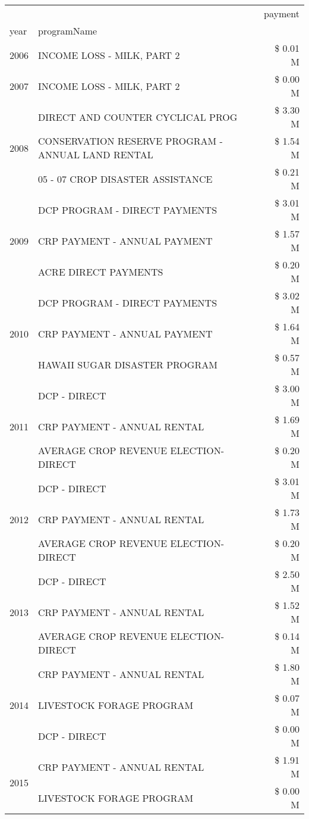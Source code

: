 \begin{tabular}{llr}
\toprule
 &  & payment \\
year & programName &  \\
\midrule
2006 & INCOME LOSS - MILK, PART 2 & \$ 0.01 M \\
\cline{1-3}
2007 & INCOME LOSS - MILK, PART 2 & \$ 0.00 M \\
\cline{1-3}
\multirow[t]{3}{*}{2008} & DIRECT AND COUNTER CYCLICAL PROG & \$ 3.30 M \\
 & CONSERVATION RESERVE PROGRAM - ANNUAL LAND RENTAL & \$ 1.54 M \\
 & 05 - 07 CROP DISASTER ASSISTANCE & \$ 0.21 M \\
\cline{1-3}
\multirow[t]{3}{*}{2009} & DCP PROGRAM - DIRECT PAYMENTS & \$ 3.01 M \\
 & CRP PAYMENT - ANNUAL PAYMENT & \$ 1.57 M \\
 & ACRE DIRECT PAYMENTS & \$ 0.20 M \\
\cline{1-3}
\multirow[t]{3}{*}{2010} & DCP PROGRAM - DIRECT PAYMENTS & \$ 3.02 M \\
 & CRP PAYMENT - ANNUAL PAYMENT & \$ 1.64 M \\
 & HAWAII SUGAR DISASTER PROGRAM & \$ 0.57 M \\
\cline{1-3}
\multirow[t]{3}{*}{2011} & DCP - DIRECT & \$ 3.00 M \\
 & CRP PAYMENT - ANNUAL RENTAL & \$ 1.69 M \\
 & AVERAGE CROP REVENUE ELECTION-DIRECT & \$ 0.20 M \\
\cline{1-3}
\multirow[t]{3}{*}{2012} & DCP - DIRECT & \$ 3.01 M \\
 & CRP PAYMENT - ANNUAL RENTAL & \$ 1.73 M \\
 & AVERAGE CROP REVENUE ELECTION-DIRECT & \$ 0.20 M \\
\cline{1-3}
\multirow[t]{3}{*}{2013} & DCP - DIRECT & \$ 2.50 M \\
 & CRP PAYMENT - ANNUAL RENTAL & \$ 1.52 M \\
 & AVERAGE CROP REVENUE ELECTION-DIRECT & \$ 0.14 M \\
\cline{1-3}
\multirow[t]{3}{*}{2014} & CRP PAYMENT - ANNUAL RENTAL & \$ 1.80 M \\
 & LIVESTOCK FORAGE PROGRAM & \$ 0.07 M \\
 & DCP - DIRECT & \$ 0.00 M \\
\cline{1-3}
\multirow[t]{3}{*}{2015} & CRP PAYMENT - ANNUAL RENTAL & \$ 1.91 M \\
 & LIVESTOCK FORAGE PROGRAM & \$ 0.00 M \\

\end{tabular}
